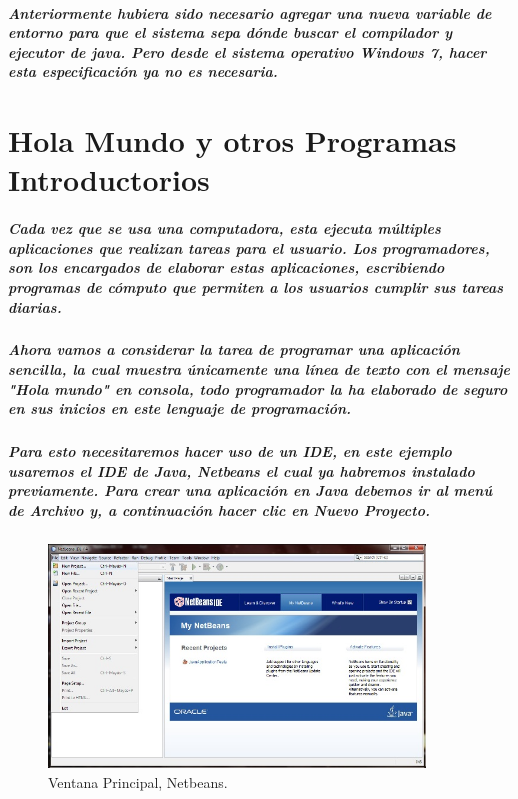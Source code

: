 \documentclass[12pt]{book} %
\begin{document}
\paragraph{Anteriormente hubiera sido necesario agregar una nueva variable de entorno para que el sistema sepa dónde buscar el compilador y ejecutor de java. Pero desde el sistema operativo Windows 7, hacer esta especificación ya no es necesaria.}


\chapter{Hola Mundo y otros Programas Introductorios}

\paragraph{Cada vez que se usa una computadora, esta ejecuta múltiples aplicaciones que realizan tareas para el usuario. Los programadores, son los encargados de elaborar estas aplicaciones, escribiendo programas de cómputo que permiten a los usuarios cumplir sus tareas diarias.}
\paragraph{Ahora vamos a considerar la tarea de programar una aplicación sencilla, la cual muestra únicamente una línea de texto con el mensaje "Hola mundo" en consola, todo programador la ha elaborado de seguro en sus inicios en este lenguaje de programación.}
\paragraph{Para esto necesitaremos hacer uso de un IDE, en este ejemplo usaremos el IDE de Java, Netbeans el cual ya habremos instalado previamente.
Para crear una aplicación en Java debemos ir al menú de Archivo y, a continuación hacer clic en Nuevo Proyecto.}

	\begin{figure}[h!]
		\centering
			\includegraphics[width=10cm]{Hola_mundo_001.jpg}
			\caption{Ventana Principal, Netbeans.}
		
	\end{figure}
\end{document}
